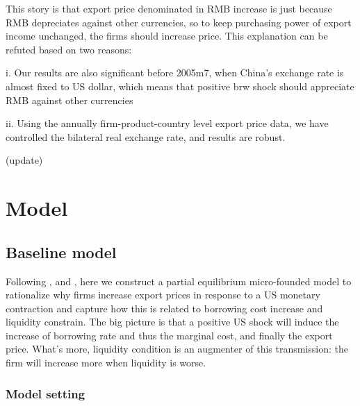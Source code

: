 \documentclass[12pt]{article}
\begin{document}
This story is that export price denominated in RMB increase is just because RMB depreciates against other currencies, so to keep purchasing power of export income unchanged, the firms should increase price. This explanation can be refuted based on two reasons:

i. Our results are also significant before 2005m7, when China’s exchange rate is almost fixed to US dollar, which means that positive brw shock should appreciate RMB against other currencies


ii. Using the annually firm-product-country level export price data, we have controlled the bilateral real exchange rate, and results are robust.

(update)


\section{Model}

\subsection{Baseline model}
Following \cite{melitz2003impact}, \cite{manova2013credit} and \cite{fan2015credit}, here we construct a partial equilibrium micro-founded model to rationalize why firms increase export prices in response to a US monetary contraction and capture how this is related to borrowing cost increase and liquidity constrain. The big picture is that a positive US shock will induce the increase of borrowing rate and thus the marginal cost, and finally the export price. What’s more, liquidity condition is an augmenter of this transmission: the firm will increase more when liquidity is worse.

\subsubsection{Model setting}
\end{document}
